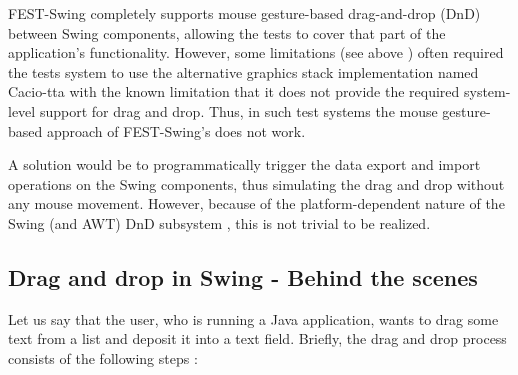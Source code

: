 FEST-Swing completely supports mouse gesture-based drag-and-drop (DnD) between Swing components, allowing the tests to cover that part of the application's functionality. However, some limitations (see above ) often required the tests system to use the alternative graphics stack implementation named Cacio-tta \cite{Cacio_Tta_FEST} with the known limitation that it does not provide the required system-level support for drag and drop. Thus, in such test systems the mouse gesture-based approach of FEST-Swing's does not work.

A solution would be to programmatically trigger the data export and import operations on the Swing components, thus simulating the drag and drop without any mouse movement. However, because of the platform-dependent nature of the Swing (and AWT) DnD subsystem \cite{IntroDnD} \cite{DnDSubsystem}, this is not trivial to be realized.

\subsection{Drag and drop in Swing - Behind the scenes}\label{sec:dnd-swing}

Let us say that the user, who is running a Java application, wants to drag some text from a list and deposit it into a text field. Briefly, the drag and drop process consists of the following steps \cite{IntroDnD}:

